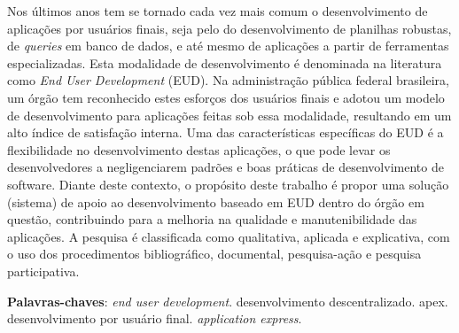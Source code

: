 \begin{resumo}

Nos últimos anos tem se tornado cada vez mais comum o desenvolvimento de aplicações por usuários finais, seja pelo do desenvolvimento de planilhas robustas, de \textit{queries} em banco de dados, e até mesmo de aplicações a partir de ferramentas especializadas. Esta modalidade de desenvolvimento é denominada na literatura como \textit{End User Development} (EUD). Na administração pública federal brasileira, um órgão tem reconhecido estes esforços dos usuários finais e adotou um modelo de desenvolvimento para aplicações feitas sob essa modalidade, resultando em um alto índice de satisfação interna. Uma das características específicas do EUD é a flexibilidade no desenvolvimento destas aplicações, o que pode levar os desenvolvedores a negligenciarem padrões e boas práticas de desenvolvimento de software. Diante deste contexto, o propósito deste trabalho é propor uma solução (sistema) de apoio ao desenvolvimento baseado em EUD dentro do órgão em questão, contribuindo para a melhoria na qualidade e manutenibilidade das aplicações. A pesquisa é classificada como qualitativa, aplicada e explicativa, com o uso dos procedimentos bibliográfico, documental, pesquisa-ação e pesquisa participativa.




 \vspace{\onelineskip}
    
 \noindent
 \textbf{Palavras-chaves}: \textit{end user development}. desenvolvimento descentralizado. apex. desenvolvimento por usuário final. \textit{application express}.
\end{resumo}
